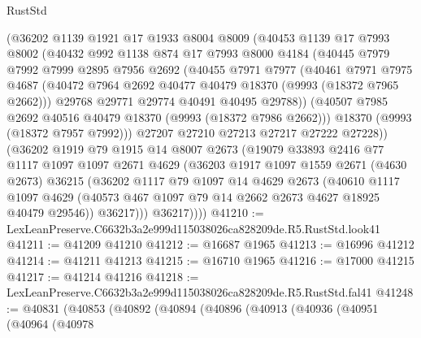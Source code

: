 \begin{lexlean}{RustStd}
\begin{coremodule}
        (@36202
          @1139
          @1921
          @17
          @1933
          @8004
          @8009
          (@40453
            @1139
            @17
            @7993
            @8002
            (@40432
              @992
              @1138
              @874
              @17
              @7993
              @8000
              @4184
              (@40445
                @7979
                @7992
                @7999
                @2895
                @7956
                @2692
                (@40455
                  @7971
                  @7977
                  (@40461
                    @7971
                    @7975
                    @4687
                    (@40472 @7964 @2692 @40477 @40479 @18370 (@9993 (@18372 @7965 @2662)))
                    @29768
                    @29771
                    @29774
                    @40491
                    @40495
                    @29788))
                (@40507 @7985 @2692 @40516 @40479 @18370 (@9993 (@18372 @7986 @2662)))
                @18370
                (@9993 (@18372 @7957 @7992)))
              @27207
              @27210
              @27213
              @27217
              @27222
              @27228))
          (@36202
            @1919
            @79
            @1915
            @14
            @8007
            @2673
            (@19079
              @33893
              @2416
              @77
              @1117
              @1097
              @1097
              @2671
              @4629
              (@36203
                @1917
                @1097
                @1559
                @2671
                (@4630 @2673)
                @36215
                (@36202
                  @1117
                  @79
                  @1097
                  @14
                  @4629
                  @2673
                  (@40610
                    @1117
                    @1097
                    @4629
                    (@40573 @467 @1097 @79 @14 @2662 @2673 @4627 @18925 @40479 @29546))
                  @36217)))
            @36217))))
@41210 := LexLeanPreserve.C6632b3a2e999d115038026ca828209de.R5.RustStd.look41
@41211 := @41209 @41210
@41212 := @16687 @1965
@41213 := @16996 @41212
@41214 := @41211 @41213
@41215 := @16710 @1965
@41216 := @17000 @41215
@41217 := @41214 @41216
@41218 := LexLeanPreserve.C6632b3a2e999d115038026ca828209de.R5.RustStd.fal41
@41248 := @40831
    (@40853
      (@40892
        (@40894
          (@40896
            (@40913
              (@40936
                (@40951
                  (@40964
                    (@40978

\end{coremodule}
\end{lexlean}
